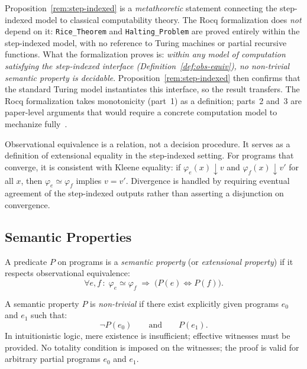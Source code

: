 \documentclass{lmcs}
\begin{document}
\begin{rem}
\label{rem:model-scope}
Proposition~\ref{rem:step-indexed} is a \emph{metatheoretic} statement
connecting the step-indexed model to classical computability theory.
The Rocq formalization does \emph{not} depend on it: \texttt{Rice\_Theorem}
and \texttt{Halting\_Problem} are proved entirely within the step-indexed
model, with no reference to Turing machines or partial recursive functions.
What the formalization proves is: \emph{within any model of computation
satisfying the step-indexed interface (Definition~\ref{def:obs-equiv}),
no non-trivial semantic property is decidable}.
Proposition~\ref{rem:step-indexed} then confirms that the standard
Turing model instantiates this interface, so the result transfers.
The Rocq formalization takes monotonicity (part~1) as a definition;
parts~2 and~3 are paper-level arguments that would require a concrete
computation model to mechanize fully~\cite{appel2001}.
\end{rem}

\begin{rem}
Observational equivalence is a relation, not a decision procedure. It serves as
a definition of extensional equality in the step-indexed setting. For programs
that converge, it is consistent with Kleene equality: if $\varphi_e(x)
\downarrow v$ and $\varphi_f(x) \downarrow v'$ for all $x$, then
$\varphi_e \simeq \varphi_f$ implies $v = v'$. Divergence is handled by
requiring eventual agreement of the step-indexed outputs rather than
asserting a disjunction on convergence.
\end{rem}

\subsection{Semantic Properties}

\begin{defi}
A predicate \(P\) on programs is a \emph{semantic property} (or
\emph{extensional property}) if it respects observational equivalence:
\[
  \forall e, f\,:\; \varphi_e \simeq \varphi_f \;\Rightarrow\;
  \bigl(P(e) \Leftrightarrow P(f)\bigr).
\]
\end{defi}

\begin{defi}
\label{def:nontrivial}
A semantic property \(P\) is \emph{non-trivial} if there exist explicitly given
programs \(e_0\) and \(e_1\) such that:
\[
  \neg P(e_0) \qquad \text{and} \qquad P(e_1).
\]
In intuitionistic logic, mere existence is insufficient; effective witnesses
must be provided. No totality condition is imposed on the witnesses; the
proof is valid for arbitrary partial programs $e_0$ and $e_1$.
\end{defi}
\end{document}
